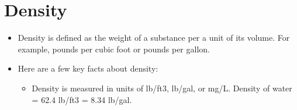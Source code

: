 %
%
%
%
%
%
%
%
%
%
%
%
%
%

\section{Density}
\begin{itemize}
\item Density is defined as the weight of a substance per a unit of its volume. For example, pounds per cubic foot or pounds per gallon.

\item Here are a few key facts about density:
\begin{itemize}

\item Density is measured in units of lb/ft3, lb/gal, or mg/L. Density of water = 62.4 lb/ft3 = 8.34 lb/gal.
\end{itemize}
\end{itemize}

